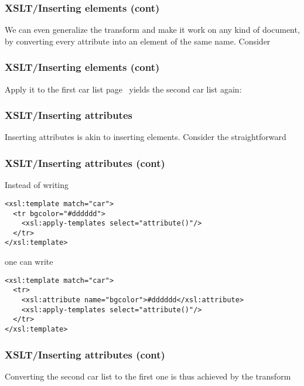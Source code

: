 %
\begin{frame} 
\frametitle{XSLT/Inserting elements (cont)}

We can even generalize the transform and make it work on any kind of
document, by converting every attribute into an element of the same
name. Consider 

\end{frame}

%
\begin{frame} 
\frametitle{XSLT/Inserting elements (cont)}

Apply it to the first car list page~\pageref{cars} yields the second
car list again: 

\end{frame}

%
\begin{frame} 
\frametitle{XSLT/Inserting attributes}

Inserting attributes is akin to inserting elements. Consider the
straightforward

\end{frame}

%
\begin{frame}[containsverbatim]
\frametitle{XSLT/Inserting attributes (cont)}

Instead of writing
{\small
\begin{verbatim}
<xsl:template match="car">
  <tr bgcolor="#dddddd">
    <xsl:apply-templates select="attribute()"/>
  </tr>
</xsl:template>
\end{verbatim}
}
one can write
{\small
\begin{verbatim}
<xsl:template match="car">
  <tr>
    <xsl:attribute name="bgcolor">#dddddd</xsl:attribute>
    <xsl:apply-templates select="attribute()"/>
  </tr>
</xsl:template>
\end{verbatim}
}

\end{frame}

%
\begin{frame} 
\frametitle{XSLT/Inserting attributes (cont)}

Converting the second car list to the first one is thus achieved by 
the transform

\end{frame}


